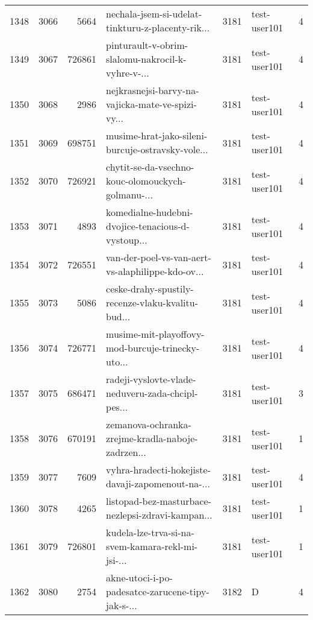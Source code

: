 \begin{tabular}{lrrlrlr}
1348 &       3066 &     5664 &  nechala-jsem-si-udelat-tinkturu-z-placenty-rik... &     3181 &                 test-user101 &               4 \\
1349 &       3067 &   726861 &  pinturault-v-obrim-slalomu-nakrocil-k-vyhre-v-... &     3181 &                 test-user101 &               4 \\
1350 &       3068 &     2986 &  nejkrasnejsi-barvy-na-vajicka-mate-ve-spizi-vy... &     3181 &                 test-user101 &               4 \\
1351 &       3069 &   698751 &  musime-hrat-jako-sileni-burcuje-ostravsky-vole... &     3181 &                 test-user101 &               4 \\
1352 &       3070 &   726921 &  chytit-se-da-vsechno-kouc-olomouckych-golmanu-... &     3181 &                 test-user101 &               4 \\
1353 &       3071 &     4893 &  komedialne-hudebni-dvojice-tenacious-d-vystoup... &     3181 &                 test-user101 &               4 \\
1354 &       3072 &   726551 &  van-der-poel-vs-van-aert-vs-alaphilippe-kdo-ov... &     3181 &                 test-user101 &               4 \\
1355 &       3073 &     5086 &  ceske-drahy-spustily-recenze-vlaku-kvalitu-bud... &     3181 &                 test-user101 &               4 \\
1356 &       3074 &   726771 &  musime-mit-playoffovy-mod-burcuje-trinecky-uto... &     3181 &                 test-user101 &               4 \\
1357 &       3075 &   686471 &  radeji-vyslovte-vlade-neduveru-zada-chcipl-pes... &     3181 &                 test-user101 &               3 \\
1358 &       3076 &   670191 &  zemanova-ochranka-zrejme-kradla-naboje-zadrzen... &     3181 &                 test-user101 &               1 \\
1359 &       3077 &     7609 &  vyhra-hradecti-hokejiste-davaji-zapomenout-na-... &     3181 &                 test-user101 &               4 \\
1360 &       3078 &     4265 &  listopad-bez-masturbace-nezlepsi-zdravi-kampan... &     3181 &                 test-user101 &               1 \\
1361 &       3079 &   726801 &  kudela-lze-trva-si-na-svem-kamara-rekl-mi-jsi-... &     3181 &                 test-user101 &               1 \\
1362 &       3080 &     2754 &  akne-utoci-i-po-padesatce-zarucene-tipy-jak-s-... &     3182 &                            D &               4 \\

\end{tabular}

